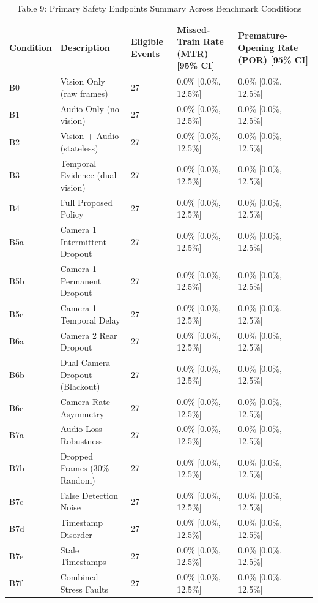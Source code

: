 \begin{table}[t]
\centering
\caption{Table 9: Primary Safety Endpoints Summary Across Benchmark Conditions}
\label{tab:table09_primary_safety_endpoints}
\begin{tabular}{lllll}
\hline
Condition & Description & Eligible Events & Missed-Train Rate (MTR) [95\% CI] & Premature-Opening Rate (POR) [95\% CI] \\
\hline
B0 & Vision Only (raw frames) & 27 & 0.0\% [0.0\%, 12.5\%] & 0.0\% [0.0\%, 12.5\%] \\
B1 & Audio Only (no vision) & 27 & 0.0\% [0.0\%, 12.5\%] & 0.0\% [0.0\%, 12.5\%] \\
B2 & Vision + Audio (stateless) & 27 & 0.0\% [0.0\%, 12.5\%] & 0.0\% [0.0\%, 12.5\%] \\
B3 & Temporal Evidence (dual vision) & 27 & 0.0\% [0.0\%, 12.5\%] & 0.0\% [0.0\%, 12.5\%] \\
B4 & Full Proposed Policy & 27 & 0.0\% [0.0\%, 12.5\%] & 0.0\% [0.0\%, 12.5\%] \\
B5a & Camera 1 Intermittent Dropout & 27 & 0.0\% [0.0\%, 12.5\%] & 0.0\% [0.0\%, 12.5\%] \\
B5b & Camera 1 Permanent Dropout & 27 & 0.0\% [0.0\%, 12.5\%] & 0.0\% [0.0\%, 12.5\%] \\
B5c & Camera 1 Temporal Delay & 27 & 0.0\% [0.0\%, 12.5\%] & 0.0\% [0.0\%, 12.5\%] \\
B6a & Camera 2 Rear Dropout & 27 & 0.0\% [0.0\%, 12.5\%] & 0.0\% [0.0\%, 12.5\%] \\
B6b & Dual Camera Dropout (Blackout) & 27 & 0.0\% [0.0\%, 12.5\%] & 0.0\% [0.0\%, 12.5\%] \\
B6c & Camera Rate Asymmetry & 27 & 0.0\% [0.0\%, 12.5\%] & 0.0\% [0.0\%, 12.5\%] \\
B7a & Audio Loss Robustness & 27 & 0.0\% [0.0\%, 12.5\%] & 0.0\% [0.0\%, 12.5\%] \\
B7b & Dropped Frames (30\% Random) & 27 & 0.0\% [0.0\%, 12.5\%] & 0.0\% [0.0\%, 12.5\%] \\
B7c & False Detection Noise & 27 & 0.0\% [0.0\%, 12.5\%] & 0.0\% [0.0\%, 12.5\%] \\
B7d & Timestamp Disorder & 27 & 0.0\% [0.0\%, 12.5\%] & 0.0\% [0.0\%, 12.5\%] \\
B7e & Stale Timestamps & 27 & 0.0\% [0.0\%, 12.5\%] & 0.0\% [0.0\%, 12.5\%] \\
B7f & Combined Stress Faults & 27 & 0.0\% [0.0\%, 12.5\%] & 0.0\% [0.0\%, 12.5\%] \\
\hline
\end{tabular}
\end{table}
